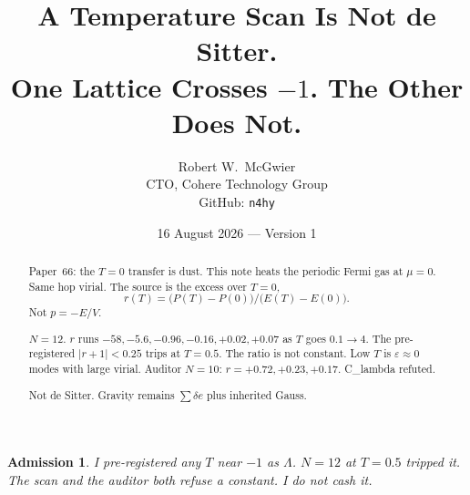 \documentclass[11pt]{article}
\title{\textbf{A Temperature Scan Is Not de Sitter.\\
One Lattice Crosses $-1$. The Other Does Not.}}
\author{Robert W.\ McGwier\\
\small CTO, Cohere Technology Group\\
\small GitHub: \texttt{n4hy}}
\date{16 August 2026 --- Version 1}
\newtheorem*{admission}{Admission}
\begin{document}
\maketitle

\begin{abstract}
\noindent
Paper~66: the $T=0$ transfer is dust. This note heats
the periodic Fermi gas at $\mu=0$. Same hop virial.
The source is the excess over $T=0$,
\[
r(T)=\bigl(P(T)-P(0)\bigr)/\bigl(E(T)-E(0)\bigr).
\]
Not $p=-E/V$.

$N=12$. $r$ runs $-58,-5.6,-0.96,-0.16,+0.02,+0.07$
as $T$ goes $0.1\to 4$. The pre-registered
$\lvert r+1\rvert<0.25$ trips at $T=0.5$.
The ratio is not constant. Low $T$ is
$\varepsilon\approx 0$ modes with large virial.
Auditor $N=10$: $r=+0.72,+0.23,+0.17$.
C\_lambda refuted.

Not de Sitter. Gravity remains $\sum\delta e$ plus
inherited Gauss.
\end{abstract}

\begin{admission}
I pre-registered any $T$ near $-1$ as $\Lambda$.
$N=12$ at $T=0.5$ tripped it. The scan and the
auditor both refuse a constant. I do not cash it.
\end{admission}
\end{document}

